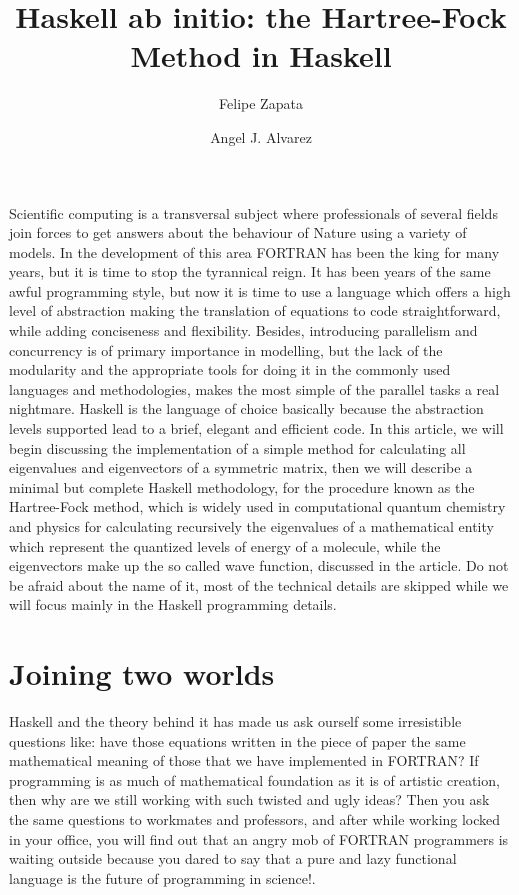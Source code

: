 \documentclass{tmr}
\title{Haskell ab initio: the Hartree-Fock Method in Haskell}
\author{Felipe Zapata\email{felipe.zapata@edu.uah.es}}
\author{Angel J. Alvarez\email{a.alvarez@uah.es}}
\begin{document}
\begin{introduction}

Scientific computing is a transversal subject where professionals of several 
fields join forces to get answers about the behaviour of Nature
using a variety of models. In the development of this area
FORTRAN has been the king for many years, but it is time to stop the 
tyrannical reign. It has been years of the same awful programming style, but now
it is time to use a language which offers a high level of abstraction 
making the translation of equations to code straightforward, while adding
conciseness and flexibility. Besides, introducing parallelism and 
concurrency is of primary importance in modelling, but the lack of the modularity 
and the appropriate tools for doing it in 
the commonly used languages and methodologies, makes the most simple of
the parallel tasks a real nightmare. Haskell is the language of choice
basically because the abstraction levels supported 
lead to a brief, elegant and efficient code. In this article, we will  
begin discussing the implementation of a simple method for calculating
all eigenvalues and eigenvectors of a symmetric matrix, then we will 
describe a minimal but complete Haskell methodology, for the procedure known as 
the Hartree-Fock method, which is widely used in computational quantum chemistry and
physics for calculating recursively the eigenvalues of a mathematical entity
which represent the quantized levels of energy of a molecule, while the eigenvectors make up
the so called wave function, discussed in the article.
 Do not be afraid about 
the name of it, most of the technical details are skipped while we will focus mainly
in the Haskell programming details.
 

\end{introduction}


\section{Joining two worlds}

Haskell and the theory behind it has made us 
ask ourself some irresistible questions like: have those equations written in the
piece of paper the same mathematical meaning of those that we 
have implemented in FORTRAN? If programming is as much of mathematical
foundation as it is of artistic creation, then why are we still working
with such twisted and ugly ideas? Then you ask the same questions to workmates
and professors, and after while working locked in your
office, you will find out that an angry mob of FORTRAN programmers is waiting outside
 because you dared to say that a pure and lazy functional language is the future of 
programming in science!. 
\end{document}
